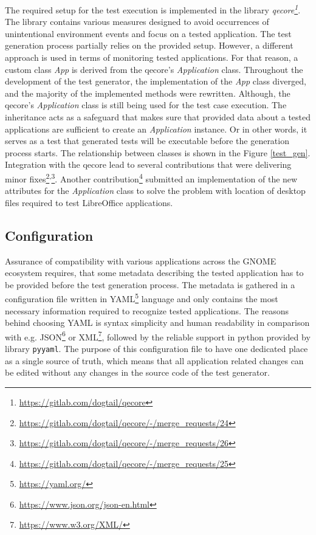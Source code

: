 The required setup for the test execution is implemented in the library \textit{qecore\footnote{\url{https://gitlab.com/dogtail/qecore}}}. The library contains various measures designed to avoid occurrences of unintentional environment events and focus on a tested application. The test generation process partially relies on the provided setup. However, a different approach is used in terms of monitoring tested applications. For that reason, a custom class \textit{App} is derived from the qecore's \textit{Application} class. Throughout the development of the test generator, the implementation of the \textit{App} class diverged, and the majority of the implemented methods were rewritten. Although, the qecore's \textit{Application} class is still being used for the test case execution. The inheritance acts as a safeguard that makes sure that provided data about a tested applications are sufficient to create an \textit{Application} instance. Or in other words, it serves as a test that generated tests will be executable before the generation process starts. The relationship between classes is shown in the Figure \ref{test_gen}. Integration with the qecore lead to several contributions that were delivering minor fixes\footnote{\url{https://gitlab.com/dogtail/qecore/-/merge_requests/24}}\textsuperscript{,}\footnote{\url{https://gitlab.com/dogtail/qecore/-/merge_requests/26}}. Another contribution\footnote{\url{https://gitlab.com/dogtail/qecore/-/merge_requests/25}} submitted an implementation of the new attributes for the \textit{Application} class to solve the problem with location of desktop files required to test LibreOffice applications.

\subsection{Configuration}
Assurance of compatibility with various applications across the GNOME ecosystem requires, that some metadata describing the tested application has to be provided before the test generation process. The metadata is gathered in a configuration file written in YAML\footnote{\url{https://yaml.org/}} language and only contains the most necessary information required to recognize tested applications. The reasons behind choosing YAML is syntax simplicity and human readability in comparison with e.g. JSON\footnote{\url{https://www.json.org/json-en.html}} or XML\footnote{\url{https://www.w3.org/XML/}}, followed by the reliable support in python provided by library \texttt{pyyaml}.\cite{yaml} The purpose of this configuration file to have one dedicated place as a single source of truth, which means that all application related changes can be edited without any changes in the source code of the test generator.

